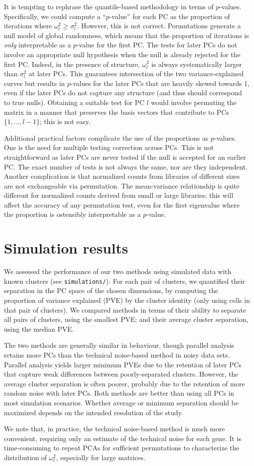 \documentclass{article}
\begin{document}
It is tempting to rephrase the quantile-based methodology in terms of $p$-values. 
Specifically, we could compute a ``$p$-value'' for each PC as the proportion of iterations where $\omega^2_l \ge \sigma^2_l$.
However, this is not correct.
Permutations generate a null model of global randomness, which means that the proportion of iterations is \textit{only} interpretable as a $p$-value for the first PC.
The tests for later PCs do not involve an appropriate null hypothesis when the null is already rejected for the first PC.
Indeed, in the presence of structure, $\omega^2_l$ is always systematically larger than $\sigma^2_l$ at later PCs.
This guarantees intersection of the two variance-explained curves but results in $p$-values for the later PCs that are heavily skewed towards 1, 
even if the later PCs do not capture any structure (and thus should correspond to true nulls).
Obtaining a suitable test for PC $l$ would involve permuting the matrix in a manner that preserves the basis vectors that contribute to PCs $\{1, \ldots, l-1\}$; this is not easy.

Additional practical factors complicate the use of the proportions as $p$-values.
One is the need for multiple testing correction across PCs.
This is not straightforward as later PCs are never tested if the null is accepted for an earlier PC.
The exact number of tests is not always the same, nor are they independent. 
Another complication is that normalized counts from libraries of different sizes are not exchangeable via permutation.
The mean-variance relationship is quite different for normalized counts derived from small or large libraries; 
this will affect the accuracy of any permutation test, even for the first eigenvalue where the proportion is ostensibly interpretable as a $p$-value.

\section{Simulation results}
We assessed the performance of our two methods using simulated data with known clusters (see \texttt{simulations/}).
For each pair of clusters, we quantified their separation in the PC space of the chosen dimensions,
by computing the proportion of variance explained (PVE) by the cluster identity (only using cells in that pair of clusters).
We compared methods in terms of their ability to separate all pairs of clusters, using the smallest PVE;
and their average cluster separation, using the median PVE.

The two methods are generally similar in behaviour, though parallel analysis retains more PCs than the technical noise-based method in noisy data sets.
Parallel analysis yields larger minimum PVEs due to the retention of later PCs that capture weak differences between poorly-separated clusters.
However, the average cluster separation is often poorer, probably due to the retention of more random noise with later PCs.
Both methods are better than using all PCs in most simulation scenarios.
Whether average or minimum separation should be maximized depends on the intended resolution of the study.

We note that, in practice, the technical noise-based method is much more convenient, requiring only an estimate of the technical noise for each gene.
It is time-consuming to repeat PCAs for sufficient permutations to characterize the distribution of $\omega^2_l$, especially for large matrices.
\end{document}
